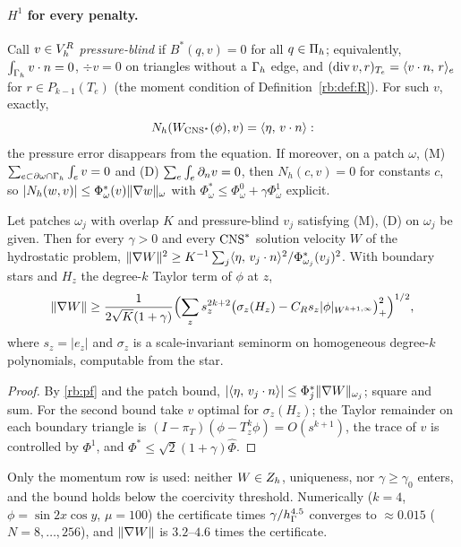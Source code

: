 \paragraph{$H^1$ for every penalty.} Call $v\in V_h^R$ \emph{pressure-blind} if $B^\ast(q,v)=0$ for all $q\in\Pi_h$; equivalently, $\int_{\Gamma_h}v\cdot n=0$, $\div v=0$ on triangles without a $\Gamma_h$ edge, and $(\operatorname{div} v,r)_{T_e}=\langle v\cdot n,\, r\rangle_e$ for $r\in P_{k-1}(T_e)$ (the moment condition of Definition~\ref{rb:def:R}). For such $v$, exactly,
\begin{equation}\label{rb:pf}
N_h(W_{\mathrm{CNS}^\ast}(\phi),v)=\langle \eta,\, v\cdot n\rangle:
\end{equation}
the pressure error disappears from the equation. If moreover, on a patch $\omega$, (M) $\sum_{e\subset\partial\omega\cap\Gamma_h}\int_ev=0$ and (D) $\sum_e\int_e\partial_n v=0$, then $N_h(c,v)=0$ for constants $c$, so $|N_h(w,v)|\le\Phi^\ast_\omega(v)\lVert \nabla w\rVert_\omega$ with $\Phi^\ast_\omega\le\Phi^0_\omega+\gamma\Phi^1_\omega$ explicit.

\begin{theorem}\label{rb:cert}
Let patches $\omega_j$ with overlap $K$ and pressure-blind $v_j$ satisfying (M), (D) on $\omega_j$ be given. Then for every $\gamma>0$ and every $\mathrm{CNS}^\ast$ solution velocity $W$ of the hydrostatic problem,
$\lVert \nabla W\rVert^2\ge K^{-1}\sum_j\langle \eta,\, v_j\cdot n\rangle^2/\Phi^\ast_{\omega_j}(v_j)^2$. With boundary stars and $H_z$ the degree-$k$ Taylor term of $\phi$ at $z$,
\[
\lVert \nabla W\rVert\ge\frac{1}{2\sqrt K(1+\gamma)}\Bigl(\sum_zs_z^{2k+2}\bigl(\sigma_z(H_z)-C_Rs_z|\phi|_{W^{k+1,\infty}}\bigr)_+^2\Bigr)^{1/2},
\]
where $s_z=|e_z|$ and $\sigma_z$ is a scale-invariant seminorm on homogeneous degree-$k$ polynomials, computable from the star.
\end{theorem}

\begin{proof}
By \eqref{rb:pf} and the patch bound, $|\langle \eta,\, v_j\cdot n\rangle|\le\Phi^\ast_j\lVert \nabla W\rVert_{\omega_j}$; square and sum. For the second bound take $v$ optimal for $\sigma_z(H_z)$; the Taylor remainder on each boundary triangle is $(I-\pi_T)(\phi-T^k_z\phi)=O(s^{k+1})$, the trace of $v$ is controlled by $\Phi^1$, and $\Phi^\ast\le\sqrt2(1+\gamma)\hat\Phi$.
\end{proof}

Only the momentum row is used: neither $W\in Z_h$, uniqueness, nor $\gamma\ge\gamma_0$ enters, and the bound holds below the coercivity threshold. Numerically ($k=4$, $\phi=\sin2x\cos y$, $\mu=100$) the certificate times $\gamma/h_\Gamma^{4.5}$ converges to $\approx0.015$ ($N=8,\dots,256$), and $\lVert \nabla W\rVert$ is $3.2$--$4.6$ times the certificate.


